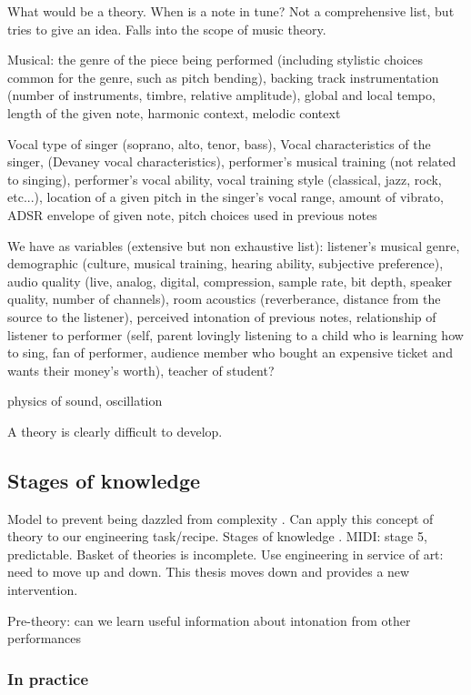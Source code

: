 What would be a theory. When is a note in tune? Not a comprehensive list, but tries to give an idea. Falls into the scope of music theory. 

Musical: the genre of the piece being performed (including stylistic choices common for the genre, such as pitch bending), backing track instrumentation (number of instruments, timbre, relative amplitude), global and local tempo, length of the given note, harmonic context, melodic context 

Vocal type of singer (soprano, alto, tenor, bass), Vocal characteristics of the singer, (Devaney vocal characteristics), performer's musical training (not related to singing), performer's vocal ability, vocal training style (classical, jazz, rock, etc...), location of a given pitch in the singer's vocal range, amount of vibrato, ADSR envelope of given note, pitch choices used in previous notes

We have as variables (extensive but non exhaustive list): listener's musical genre, demographic (culture, musical training, hearing ability, subjective preference), audio quality (live, analog, digital, compression, sample rate, bit depth, speaker quality, number of channels), room acoustics (reverberance, distance from the source to the listener), perceived intonation of previous notes, relationship of listener to performer (self, parent lovingly listening to a child who is learning how to sing, fan of performer, audience member who bought an expensive ticket and wants their money's worth), teacher of student?

physics of sound, oscillation

A theory is clearly difficult to develop.

\subsection{Stages of knowledge}
Model to prevent being dazzled from complexity \cite{bacharach1989organizational}. Can apply this concept of theory to our engineering task/recipe. Stages of knowledge \cite{}. MIDI: stage 5, predictable. Basket of theories is incomplete. Use engineering in service of art: need to move up and down. This thesis moves down and provides a new intervention. 

Pre-theory: can we learn useful information about intonation from other performances

\subsubsection{In practice}

